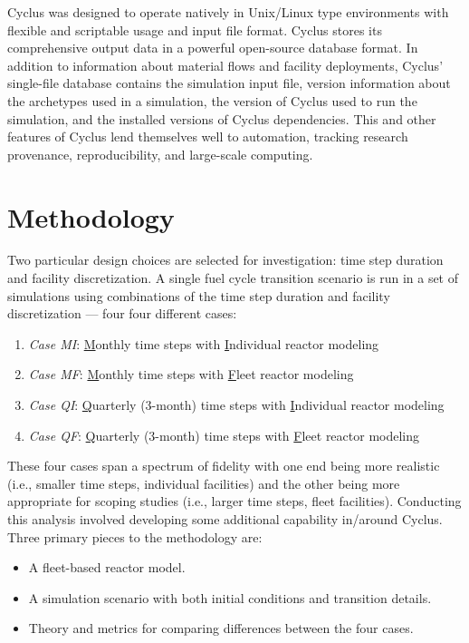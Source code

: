 \documentclass{style}
\begin{document}
Cyclus was designed to operate natively in Unix/Linux type environments with
flexible and scriptable usage and input file format.  Cyclus stores its
comprehensive output data in a powerful open-source database format.  In addition
to information about material flows and facility deployments, Cyclus'
single-file database contains the simulation input file, version information
about the archetypes used in a simulation, the version of Cyclus used to run
the simulation, and the installed versions of Cyclus dependencies. This and
other features of Cyclus lend themselves well to automation, tracking research
provenance, reproducibility, and large-scale computing.

\section{Methodology}

Two particular design choices are selected for investigation: time step
duration and facility discretization.  A single fuel cycle transition scenario
is run in a set of simulations using combinations of the time step duration
and facility discretization  --- four four different cases:

\begin{enumerate}

    \item \emph{Case MI}: \underline{M}onthly time steps with \underline{I}ndividual reactor modeling
    \item \emph{Case MF}: \underline{M}onthly time steps with \underline{F}leet reactor modeling
    \item \emph{Case QI}: \underline{Q}uarterly (3-month) time steps with \underline{I}ndividual reactor modeling
    \item \emph{Case QF}: \underline{Q}uarterly (3-month) time steps with \underline{F}leet reactor modeling

\end{enumerate}

\noindent
These four cases span a spectrum of fidelity with one end being more realistic
(i.e., smaller time steps, individual facilities) and the other being more
appropriate for scoping studies (i.e.,  larger time steps, fleet facilities).
Conducting this analysis involved developing some additional capability
in/around Cyclus.  Three primary pieces to the methodology are:

\begin{itemize}

    \item A fleet-based reactor model.

    \item A simulation scenario with both initial conditions and transition
        details.

    \item Theory and metrics for comparing differences between the four cases.

\end{itemize}
\end{document}
